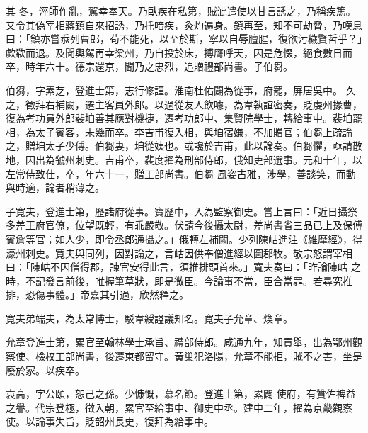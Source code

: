\begin{pinyinscope}
 其
 冬，涇師作亂，駕幸奉天。乃臥疾在私第，賊泚遣使以甘言誘之，乃稱疾篤。又令其偽宰相蔣鎮自來招誘，乃托喑疾，灸灼遍身。鎮再至，知不可劫脅，乃嘆息曰：「鎮亦嘗忝列曹郎，茍不能死，以至於斯，寧以自辱膻腥，復欲污穢賢哲乎？」歔欷而退。及聞輿駕再幸梁州，乃自投於床，搏膺呼天，因是危惙，絕食數日而卒，時年六十。德宗還京，聞乃之忠烈，追贈禮部尚書。子伯芻。



 伯芻，字素芝，登進士第，志行修謹。淮南杜佑闢為從事，府罷，屏居吳中。
 久之，徵拜右補闕，遷主客員外郎。以過從友人飲噱，為韋執誼密奏，貶虔州掾曹，復為考功員外郎裴垍善其應對機捷，遷考功郎中、集賢院學士，轉給事中。裴垍罷相，為太子賓客，未幾而卒。李吉甫復入相，與垍宿嫌，不加贈官；伯芻上疏論之，贈垍太子少傅。伯芻妻，垍從姨也。或讒於吉甫，此以論奏。伯芻懼，亟請散地，因出為虢州刺史。吉甫卒，裴度擢為刑部侍郎，俄知吏部選事。元和十年，以左常侍致仕，卒，年六十一，贈工部尚書。伯芻
 風姿古雅，涉學，善談笑，而動與時適，論者稍薄之。



 子寬夫，登進士第，歷諸府從事。寶歷中，入為監察御史。嘗上言曰：「近日攝祭多差王府官僚，位望既輕，有乖嚴敬。伏請今後攝太尉，差尚書省三品已上及保傅賓詹等官；如人少，即令丞郎通攝之。」俄轉左補闕。少列陳岵進注《維摩經》，得濠州刺史。寬夫與同列，因對論之，言岵因供奉僧進經以圖郡牧。敬宗怒謂宰相曰：「陳岵不因僧得郡，諫官安得此言，須推排頭首來。」寬夫奏曰：「昨論陳岵
 之時，不記發言前後，唯握筆草狀，即是微臣。今論事不當，臣合當罪。若尋究推排，恐傷事體。」帝嘉其引過，欣然釋之。



 寬夫弟端夫，為太常博士，駁韋綬謚議知名。寬夫子允章、煥章。



 允章登進士第，累官至翰林學士承旨、禮部侍郎。咸通九年，知貢舉，出為鄂州觀察使、檢校工部尚書，後遷東都留守。黃巢犯洛陽，允章不能拒，賊不之害，坐是廢於家。以疾卒。



 袁高，字公頤，恕己之孫。少慷慨，慕名節。登進士第，累闢
 使府，有贊佐裨益之譽。代宗登極，徵入朝，累官至給事中、御史中丞。建中二年，擢為京畿觀察使。以論事失旨，貶韶州長史，復拜為給事中。




\end{pinyinscope}
